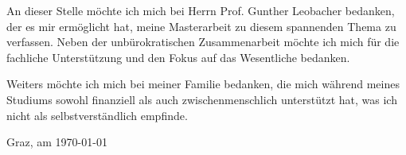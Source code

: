 
An dieser Stelle m\"ochte ich mich bei Herrn Prof. Gunther Leobacher bedanken, der es mir erm\"oglicht hat, meine Masterarbeit zu
diesem spannenden Thema zu verfassen. Neben der unb\"urokratischen Zusammenarbeit m\"ochte ich mich f\"ur die fachliche
Unterst\"utzung und den Fokus auf das Wesentliche bedanken.

Weiters m\"ochte ich mich bei meiner Familie bedanken, die mich w\"ahrend meines Studiums sowohl finanziell als auch zwischenmenschlich unterst\"utzt hat, 
was ich nicht als selbstverst\"andlich empfinde.

Graz, am \today{}